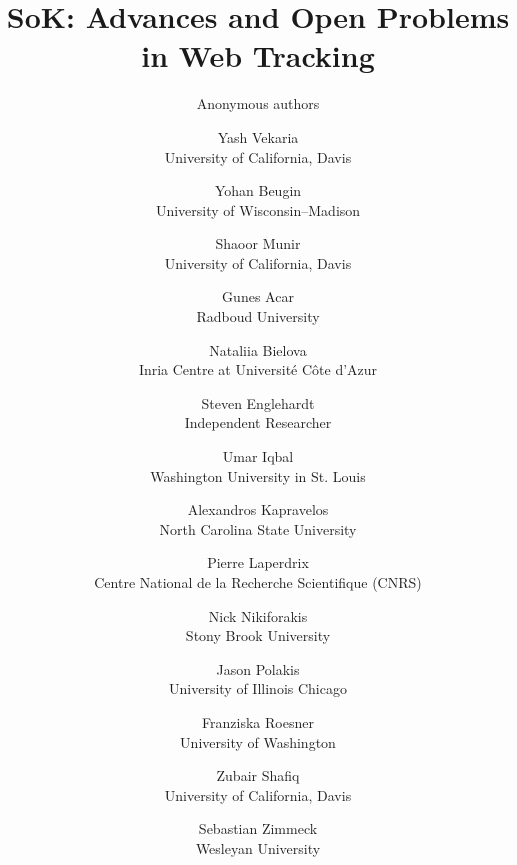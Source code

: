 \documentclass[letterpaper,twocolumn,10pt]{article}
\begin{document}
\date{}

\title{\Large \bf SoK: Advances and Open Problems in Web Tracking}


\ifanonymous
\author{Anonymous authors} %
\else
\author{
{\rm Yash Vekaria}\\
University of California, Davis
\and
{\rm Yohan Beugin}\\
University of Wisconsin–Madison
\and
{\rm Shaoor Munir}\\
University of California, Davis
\and
{\rm Gunes Acar}\\
Radboud University
\and
{\rm Nataliia Bielova}\\
Inria Centre at Université Côte d’Azur
\and
{\rm Steven Englehardt}\\
Independent Researcher
\and
{\rm Umar Iqbal}\\
Washington University in St. Louis
\and
{\rm Alexandros Kapravelos}\\
North Carolina State University
\and
{\rm Pierre Laperdrix}\\
Centre National de la Recherche Scientifique (CNRS)
\and
{\rm Nick Nikiforakis}\\
Stony Brook University
\and
{\rm Jason Polakis}\\
University of Illinois Chicago
\and
{\rm Franziska Roesner}\\
University of Washington
\and
{\rm Zubair Shafiq}\\
University of California, Davis
\and
{\rm Sebastian Zimmeck}\\
Wesleyan University
} %

\fi

\maketitle













\end{document}
